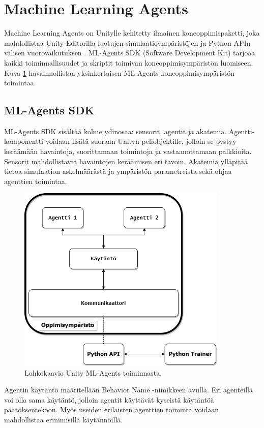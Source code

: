 \documentclass[utf8]{gradu3}
\begin{document}
\section{Machine Learning Agents}

Machine Learning Agents on Unitylle kehitetty ilmainen koneoppimispaketti, joka mahdollistaa Unity Editorilla luotujen simulaatioympäristöjen ja Python APIn välisen vuorovaikutuksen \parencite{juliani2018unity}. ML-Agents SDK (Software Development Kit) tarjoaa kaikki toiminnallisuudet ja skriptit toimivan koneoppimisympäristön luomiseen. Kuva \ref{mlagentsstructure} havainnollistaa yksinkertaisen ML-Agents koneoppimisympäristön toimintaa.

\subsection{ML-Agents SDK}

ML-Agents SDK sisältää kolme ydinosaa: sensorit, agentit ja akatemia. Agentti-komponentti voidaan lisätä suoraan Unityn peliobjektille, jolloin se pystyy keräämään havaintoja, suorittamaan toimintoja ja vastaanottamaan palkkioita. Sensorit mahdollistavat havaintojen keräämisen eri tavoin. Akatemia ylläpitää tietoa simulaation askelmäärästä ja ympäristön parametreista sekä ohjaa agenttien toimintaa.

\begin{figure}[h]
\centering
\includegraphics[width=10cm]{mlagents_structure.png}
\caption{Lohkokaavio Unity ML-Agents toiminnasta.}
\label{mlagentsstructure}
\end{figure}

Agentin käytäntö määritellään Behavior Name -nimikkeen avulla. Eri agenteilla voi olla sama käytäntö, jolloin agentit käyttävät kyseistä käytäntöä päätöksentekoon. Myös useiden erilaisten agenttien toiminta voidaan mahdollistaa erinimisillä käytännöillä.
\end{document}
